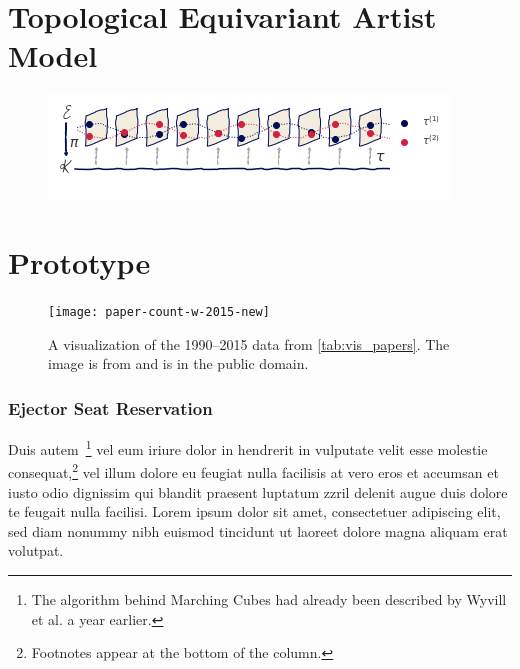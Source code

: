 \documentclass[journal]{vgtc}                %
\begin{document}
\section{Topological Equivariant Artist Model}
\begin{figure}[tb]
  \centering %
  \includegraphics[width=\columnwidth]{fiberbundle.png}
  \label{fig:sample}
 \end{figure}
\section{Prototype}

\begin{figure}[tb]
 \centering %
 \texttt{[image: paper-count-w-2015-new]}
 \caption{A visualization of the 1990--2015 data from \autoref{tab:vis_papers}. The image is from \cite{Isenberg:2017:VMC} and is in the public domain.}
 \label{fig:sample}
\end{figure}

\subsubsection{Ejector Seat Reservation}

Duis autem~\cite{Lorensen:1987:MCA}\footnote{The algorithm behind
Marching Cubes \cite{Lorensen:1987:MCA} had already been
described by Wyvill et al. \cite{Wyvill:1986:DSS} a year
earlier.} vel eum iriure dolor in hendrerit
in vulputate velit esse molestie consequat,\footnote{Footnotes
appear at the bottom of the column.} vel illum dolore eu
feugiat nulla facilisis at vero eros et accumsan et iusto odio
dignissim qui blandit praesent luptatum zzril delenit augue duis
dolore te feugait nulla facilisi. Lorem ipsum dolor sit amet,
consectetuer adipiscing elit, sed diam nonummy nibh euismod tincidunt
ut laoreet dolore magna aliquam erat volutpat.
\end{document}
